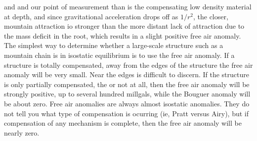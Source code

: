\begin{tcolorbox}[enhanced jigsaw,breakable,pad at break*=1mm,
    colback=blue!5!white,colframe=babyblueeyes,title=Solutions]
    and and our point of measurement than is the compensating low density material at depth, and since gravitational acceleration drops off as $1/r^2$, the closer, mountain attraction io stronger than the more distant lack of attraction due to the mass deficit in the root, which results in a slight positive free air anomaly. The simplest way to determine whether a large-scale structure such as a mountain chain is in isostatic equilibrium is to use the free air anomaly. If a structure is totally compensated, away from the edges of the structure the free air anomaly will be very small. Near the edges is difficult to discern. If the structure is only partially compensated, the or not at all, then the free air anomaly will be strongly positive, up to several hundred millgals, while the Bouguer anomaly will be about zero. Free air anomalies are always almost isostatic anomalies. They do not tell you what type of compensation is ocurring (ie, Pratt versus Airy), but if compensation of any mechanism is complete, then the free air anomaly will be nearly zero.
  \end{tcolorbox}
\fi